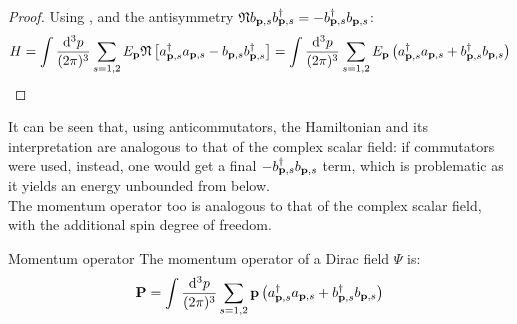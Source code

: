 \begin{proofbox}
\begin{proof}
    Using ,  and the antisymmetry $ \mathfrak{N} b_{\mathbf{p},s} b_{\mathbf{p},s}^\dagger = - b_{\mathbf{p},s}^\dagger b_{\mathbf{p},s} $:
    \begin{equation*}
      H = \int \frac{\mathrm{d}^3p}{(2\pi)^3} \sum_{s = 1,2} E_{\mathbf{p}} \mathfrak{N} \left[ a_{\mathbf{p},s}^\dagger a_{\mathbf{p},s} - b_{\mathbf{p},s} b_{\mathbf{p},s}^\dagger \right] = \int \frac{\mathrm{d}^3p}{(2\pi)^3} \sum_{s = 1,2} E_{\mathbf{p}} \left( a_{\mathbf{p},s}^\dagger a_{\mathbf{p},s} + b_{\mathbf{p},s}^\dagger b_{\mathbf{p},s} \right)
    \end{equation*}
  \end{proof}

\end{proofbox}

It can be seen that, using anticommutators, the Hamiltonian and its interpretation are analogous to that of the complex scalar field: if commutators were used, instead, one would get a final $ - b_{\mathbf{p},s}^\dagger b_{\mathbf{p},s} $ term, which is problematic as it yields an energy unbounded from below\footnotemark{}.\\
The momentum operator too is analogous to that of the complex scalar field, with the additional spin degree of freedom.
%
%
\begin{proposition}{Momentum operator}{}
  The momentum operator of a Dirac field $ \Psi $ is:
  \begin{equation}
    \mathbf{P} = \int \frac{\mathrm{d}^3p}{(2\pi)^3} \sum_{s = 1,2} \mathbf{p} \left( a_{\mathbf{p},s}^\dagger a_{\mathbf{p},s} + b_{\mathbf{p},s}^\dagger b_{\mathbf{p},s} \right)
  \end{equation}
\end{proposition}

